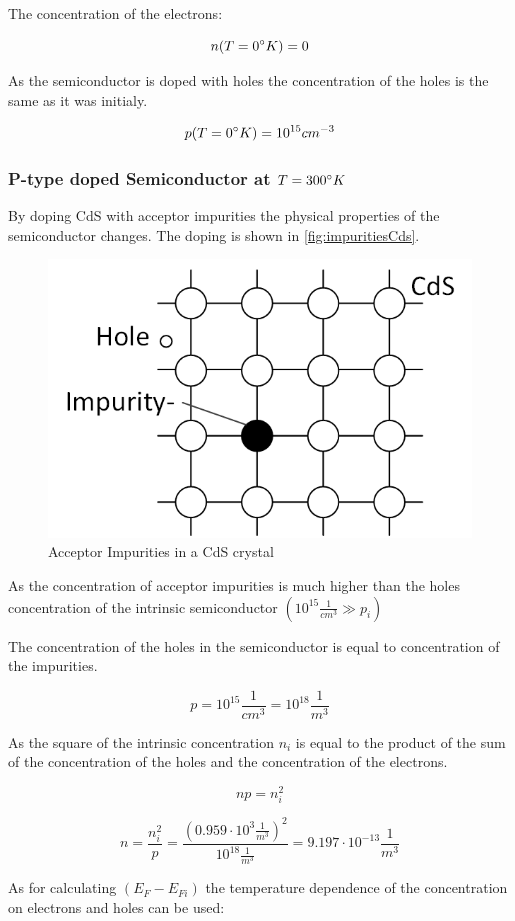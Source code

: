 The concentration of the electrons:

$$n(T=0 \degree K) = 0$$

As the semiconductor is doped with holes the concentration of the
holes is the same as it was initialy.

$$p(T=0 \degree K) = 10^{15}cm^{-3}$$


\subsubsection*{P-type doped Semiconductor at $T=300\degree K$}

By doping CdS with acceptor impurities the physical properties of the
semiconductor changes. The doping is shown in  \autoref{fig:impuritiesCds}.

\begin{figure}[H]
  \centering
  \includegraphics[width=0.5\linewidth]{Graphics/Chapter3/impurity_Cds.png}
  \caption{Acceptor Impurities in a CdS crystal}
  \label{fig:impuritiesCds}
\end{figure}

As the concentration of acceptor impurities is much higher than
the holes concentration of the intrinsic semiconductor 
$(10^{15} \frac{1}{cm^3} \gg p_i)$

The concentration of the holes in the semiconductor is equal to concentration
of the impurities.

$$p = 10^{15} \frac{1}{cm^3} = 10^{18} \frac{1}{m^3}$$

As the square of the intrinsic concentration $n_i$ is equal to the product
of the sum of the concentration of the holes and the concentration of the
electrons.

$$np = n_i^2$$

$$n = \frac{n_i^2}{p} = \frac{(0.959 \cdot 10^3 \frac{1}{m^3})^2}{10^{18} \frac{1}{m^3}} = 9.197 \cdot 10^{-13} \frac{1}{m^3}$$

As for calculating $(E_F-E_{Fi})$ the temperature dependence of the
concentration on electrons and holes can be used:

